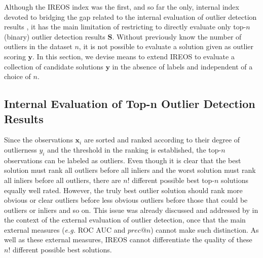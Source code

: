 Although the IREOS index was the first, and so far the only, internal index devoted to bridging the gap related to the internal evaluation of outlier detection results \cite{zimek2013,marques2015}, it has the main limitation of restricting to directly evaluate only top-$n$ (binary) outlier detection results $\mathbf{S}$. Without previously know the number of outliers in the dataset $n$, it is not possible to evaluate a solution given as outlier scoring $\mathbf{y}$. In this section, we devise means to extend IREOS to evaluate a collection of candidate solutions $\mathbf{y}$ in the absence of labels and independent of a choice of $n$.

\subsection{Internal Evaluation of Top-n Outlier Detection Results}
Since the observations $\mathbf{x}_i$ are sorted and ranked according to their degree of outlierness $y_i$ and the threshold in the ranking is established, the top-$n$ observations can be labeled as outliers. Even though it is clear that the best solution must rank all outliers before all inliers and the worst solution must rank all inliers before all outliers, there are $n!$ different possible best top-$n$ solutions equally well rated. However, the truly best outlier solution should rank more obvious or clear outliers before less obvious outliers before those that could be outliers or inliers and so on. This issue was already discussed and addressed by \cite{schubert2012} in the context of the external evaluation of outlier detection, once that the main external measures (\textit{e.g.} ROC AUC and $prec@n$) cannot make such distinction. As well as these external measures, IREOS cannot differentiate the quality of these $n!$ different possible best solutions.

